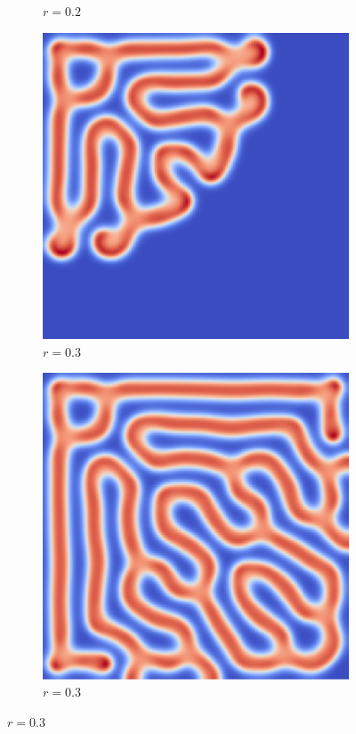 \documentclass[12pt, letterpaper]{article}
\begin{document}
\begin{figure}[h]
\begin{subfigure}[b]{.22\linewidth}
    \caption{$r=0.2$}
  \end{subfigure}
  \begin{subfigure}[b]{.22\linewidth}
    \includegraphics[width=\linewidth]{GrayScott/coral5000.png}
    \caption{$r=0.3$}
  \end{subfigure}
  \begin{subfigure}[b]{.22\linewidth}
    \includegraphics[width=\linewidth]{GrayScott/coral10000.png}
    \caption{$r=0.3$}
  \end{subfigure}
\end{figure}
\end{document}
